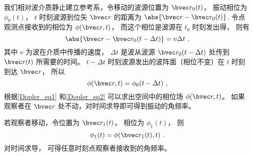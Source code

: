 

我们相对波介质静止建立参考系，令移动的波源位置为 $\bvec r_0(t)$， 振动相位为 $\phi_0(t)$， $t$ 时刻波源到位矢 $\bvec r$ 的距离为 $\abs{\bvec r - \bvec r_0(t)}$. 令点观测点接收到的相位为 $\phi(\bvec r, t)$， 而这个相位是波源在 $t_0$ 时刻发出得， 则有
\begin{equation}\label{Dopler_eq1}
\abs{\bvec r - \bvec r_0(t-\Delta t)} = v\Delta t~.
\end{equation}
其中 $v$ 为波在介质中传播的速度， $\Delta t$ 是波从波源 $\bvec r_0(t - \Delta t)$ 处传到 $\bvec r(t)$ 所需要的时间。 $t - \Delta t$ 时刻波源发出的波阵面（相位不变）在 $t$ 时刻到达 $\bvec r$， 所以
\begin{equation}\label{Dopler_eq2}
\phi(\bvec r, t) = \phi_0(t - \Delta t)~,
\end{equation}
根据\autoref{Dopler_eq1} 和\autoref{Dopler_eq2} 可以求出空间中的相位场 $\phi(\bvec r, t)$。 如果观察者在 $\bvec r$ 处不动，对时间求导即可得到振动的角频率。

若观察者移动，令位置为 $\bvec r_1(t)$， 相位为 $\phi_1(t)$， 则
\begin{equation}\label{Dopler_eq3}
\phi_1(t) = \phi(\bvec r_1(t), t)~.
\end{equation}
对时间求导， 可得任意时刻点观察者接收到的角频率。



